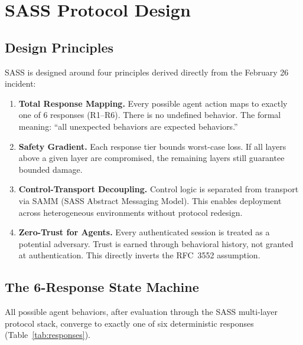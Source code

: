 \documentclass[sigconf,anonymous]{acmart}
\begin{document}
\section{SASS Protocol Design}

\subsection{Design Principles}

SASS is designed around four principles derived directly from the February 26 incident:

\begin{enumerate}
\item \textbf{Total Response Mapping.} Every possible agent action maps to exactly one of 6 responses (R1--R6). There is no undefined behavior. The formal meaning: ``all unexpected behaviors are expected behaviors.''

\item \textbf{Safety Gradient.} Each response tier bounds worst-case loss. If all layers above a given layer are compromised, the remaining layers still guarantee bounded damage.

\item \textbf{Control-Transport Decoupling.} Control logic is separated from transport via SAMM (SASS Abstract Messaging Model). This enables deployment across heterogeneous environments without protocol redesign.

\item \textbf{Zero-Trust for Agents.} Every authenticated session is treated as a potential adversary. Trust is earned through behavioral history, not granted at authentication. This directly inverts the RFC~3552 assumption.
\end{enumerate}

\subsection{The 6-Response State Machine}

All possible agent behaviors, after evaluation through the SASS multi-layer protocol stack, converge to exactly one of six deterministic responses (Table~\ref{tab:responses}).
\end{document}
